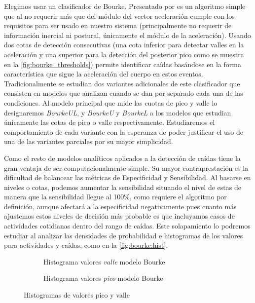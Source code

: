 Elegimos usar un clasificador de Bourke. Presentado por  es un algoritmo simple que al no requerir más que del módulo del vector aceleración cumple con los requisitos para ser usado en nuestro sistema (principalmente no requerir de información inercial ni postural, únicamente el módulo de la aceleración). Usando dos cotas de detección consecutivas (una cota inferior para detectar valles en la aceleración y una superior para la detección del posterior pico como se muestra en la \autoref{fig:bourke_thresholds}) permite identificar caídas basándose en la forma característica que sigue la aceleración del cuerpo en estos eventos. Tradicionalmente se estudian dos variantes adicionales de este clasificador que consisten en modelos que analizan cuando se dan por separado cada una de las condiciones. Al modelo principal que mide las cuotas de pico y valle lo designaremos \textit{BourkeUL}, y \textit{BourkeU} y \textit{BourkeL} a los modelos que estudian únicamente las cotas de pico o valle respectivamente. Estudiaremos el comportamiento de cada variante con la esperanza de poder justificar el uso de una de las variantes parciales por su mayor simplicidad.

Como el resto de modelos analíticos aplicados a la detección de caídas tiene la gran ventaja de ser computacionalmente simple. Su mayor contraprestación es la dificultad de balancear las métricas de Especificidad y Sensibilidad. Al basarse en niveles o cotas, podemos aumentar la sensibilidad situando el nivel de estas de manera que la sensibilidad llegue al 100\%, como requiere el algoritmo por definición, aunque afectará a la especificidad negativamente \cite{Aziz2017} pues cuanto más ajustemos estos niveles de decisión más probable es que incluyamos casos de actividades cotidianas dentro del rango de caídas. Este solapamiento lo podremos estudiar al analizar las densidades de probabilidad e histogramas de los valores para actividades y caídas, como en la \autoref{fig:bourke:hist}.

\begin{figure}[htb!]
  \centering
  \begin{subfigure}[b]{0.45\textwidth}
      \centering
      \caption{\footnotesize Histograma valores \textit{valle} modelo Bourke}
      \label{fig:bourke:hist:low}
  \end{subfigure}
  \hfill
  \begin{subfigure}[b]{0.45\textwidth}
      \centering
      \caption{\footnotesize Histograma valores \textit{pico} modelo Bourke}
      \label{fig:bourke:hist:high}
  \end{subfigure}
  \caption{\label{fig:bourke:hist} Histogramas de valores pico y valle}
\end{figure}

